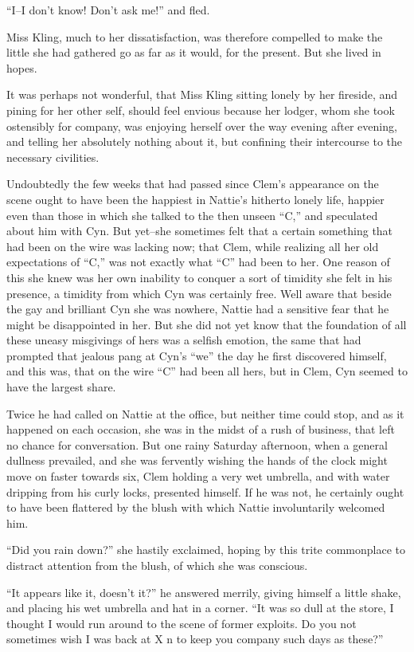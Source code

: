 ``I--I don't know! Don't ask me!'' and fled.

Miss Kling, much to her dissatisfaction, was therefore compelled to make
the little she had gathered go as far as it would, for the present. But
she lived in hopes.

It was perhaps not wonderful, that Miss Kling sitting lonely by her
fireside, and pining for her other self, should feel envious because her
lodger, whom she took ostensibly for company, was enjoying herself over
the way evening after evening, and telling her absolutely nothing about
it, but confining their intercourse to the necessary civilities.

Undoubtedly the few weeks that had passed since Clem's appearance on the
scene ought to have been the happiest in Nattie's hitherto lonely life,
happier even than those in which she talked to the then unseen ``C,'' and
speculated about him with Cyn. But yet--she sometimes felt that a
certain something that had been on the wire was lacking now; that Clem,
while realizing all her old expectations of ``C,'' was not exactly what
``C'' had been to her. One reason of this she knew was her own inability
to conquer a sort of timidity she felt in his presence, a timidity from
which Cyn was certainly free. Well aware that beside the gay and
brilliant Cyn she was nowhere, Nattie had a sensitive fear that he might
be disappointed in her. But she did not yet know that the foundation of
all these uneasy misgivings of hers was a selfish emotion, the same that
had prompted that jealous pang at Cyn's ``we'' the day he first discovered
himself, and this was, that on the wire ``C'' had been all hers, but in
Clem, Cyn seemed to have the largest share.

Twice he had called on Nattie at the office, but neither time could
stop, and as it happened on each occasion, she was in the midst of a
rush of business, that left no chance for conversation. But one rainy
Saturday afternoon, when a general dullness prevailed, and she was
fervently wishing the hands of the clock might move on faster towards
six, Clem holding a very wet umbrella, and with water dripping from his
curly locks, presented himself. If he was not, he certainly ought to
have been flattered by the blush with which Nattie involuntarily
welcomed him.

``Did you rain down?'' she hastily exclaimed, hoping by this trite
commonplace to distract attention from the blush, of which she was
conscious.

``It appears like it, doesn't it?'' he answered merrily, giving himself a
little shake, and placing his wet umbrella and hat in a corner. ``It was
so dull at the store, I thought I would run around to the scene of
former exploits. Do you not sometimes wish I was back at X n to keep you
company such days as these?''

